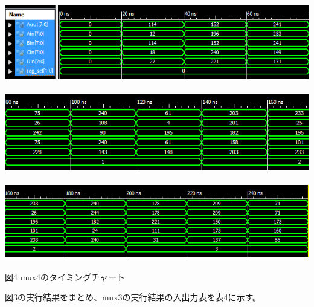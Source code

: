\documentclass[12pt]{jreport}
\begin{document}
        \begin{center}
            \includegraphics[width=18cm]{mux4_1.png} \\　\\
            \includegraphics[width=18cm]{mux4_2.png} \\　\\
            \includegraphics[width=18cm]{mux4_3.png} \\　\\
                図4 mux4のタイミングチャート
        \end{center} 
        \newpage
        図3の実行結果をまとめ、mux3の実行結果の入出力表を表4に示す。
\end{document}
